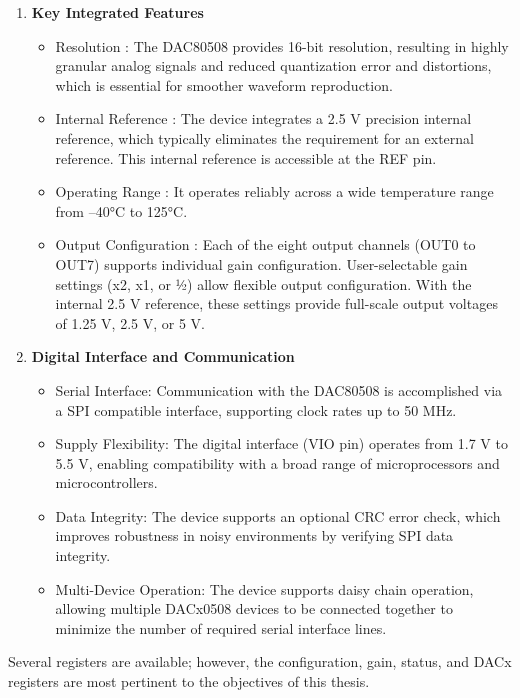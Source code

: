 \begin{enumerate}
	\item \textbf{Key Integrated Features \cite{TI_DAC80508}}
	\begin{itemize}
		\item Resolution : The DAC80508 provides 16-bit resolution, resulting in highly granular analog signals and reduced quantization error and distortions, which is essential for smoother waveform reproduction.
		\item Internal Reference : The device integrates a 2.5 V precision internal reference, which typically eliminates the requirement for an external reference. This internal reference is accessible at the REF pin.
		\item Operating Range : It operates reliably across a wide temperature range from –40°C to 125°C.
		\item Output Configuration : Each of the eight output channels (OUT0 to OUT7) supports individual gain configuration. User-selectable gain settings (x2, x1, or ½) allow flexible output configuration. With the internal 2.5 V reference, these settings provide full-scale output voltages of 1.25 V, 2.5 V, or 5 V.
	\end{itemize}
		
	\item  \textbf{Digital Interface and Communication \cite{TI_DAC80508}}
	\begin{itemize}
		\item Serial Interface: Communication with the DAC80508 is accomplished via a \acs{SPI} compatible interface, supporting clock rates up to 50 MHz.
		\item Supply Flexibility: The digital interface (VIO pin) operates from 1.7 V to 5.5 V, enabling compatibility with a broad range of microprocessors and microcontrollers.
		\item Data Integrity: The device supports an optional \acs{CRC} error check, which improves robustness in noisy environments by verifying \acs{SPI} data integrity.
		\item Multi-Device Operation: The device supports daisy chain operation, allowing multiple DACx0508 devices to be connected together to minimize the number of required serial interface lines.		
	\end{itemize}
\end{enumerate}

Several registers are available; however, the configuration, gain, status, and DACx registers are most pertinent to the objectives of this thesis.

